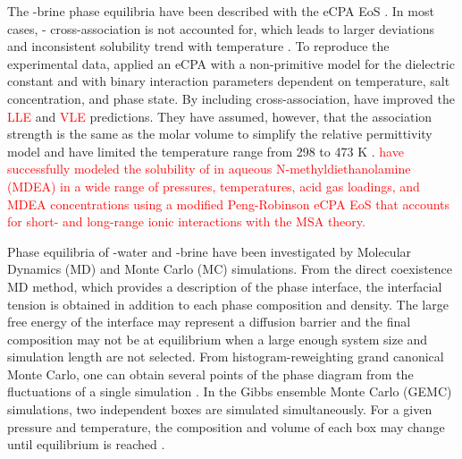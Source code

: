 The -brine phase equilibria have been described with the eCPA EoS \cite{Olsen2021, Chabab2019, Sun2019, Xiong2023, Maribo2015}. In most cases, - cross-association is not accounted for, which leads to larger deviations and inconsistent  solubility trend with temperature \cite{Maribo2015, Olsen2021}. To reproduce the experimental data, \citeauthor{Chabab2019} \cite{Chabab2019} applied an eCPA with a non-primitive model for the dielectric constant and with binary interaction parameters dependent on temperature, salt concentration, and phase state. By including cross-association, \citeauthor{Xiong2023} \cite{Xiong2023} have improved the \textcolor{red}{LLE} and \textcolor{red}{VLE}  predictions. They have assumed, however, that the association strength is the same as the molar volume to simplify the relative permittivity model and have limited the temperature range from 298 to 473 K \cite{Xiong2023}. \textcolor{red}{\citeauthor{Zoghi2012} \cite{Zoghi2012} have successfully modeled the solubility of  in aqueous N-methyldiethanolamine (MDEA) in a wide range of pressures, temperatures, acid gas loadings, and MDEA concentrations using a modified Peng-Robinson eCPA EoS that accounts for short- and long-range ionic interactions with the MSA theory.}

Phase equilibria of -water and -brine have been investigated by Molecular Dynamics (MD) \cite{Liu2013, Blazquez2024} and Monte Carlo (MC) \cite{Vorholz2000, Vorholz2004, Liu2011, Jiang2017a, Orozco2014, Vlcek2011} simulations. From the direct coexistence MD method, which provides a description of the phase interface, the interfacial tension is obtained in addition to each phase composition and density. The large free energy of the interface may represent a diffusion barrier and the final composition may not be at equilibrium when a large enough system size and simulation length are not selected. From histogram-reweighting grand canonical Monte Carlo, one can obtain several points of the phase diagram from the fluctuations of a single simulation \cite{Panagiotopoulos2000}. In the Gibbs ensemble Monte Carlo (GEMC) simulations, two independent boxes are simulated simultaneously. For a given pressure and temperature, the composition and volume of each box may change until equilibrium is reached \cite{Panagiotopoulos1992}. 


